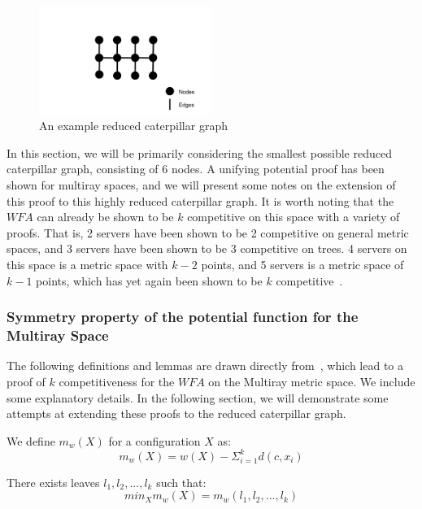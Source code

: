 \begin{figure}[H]
    \centering
    \includegraphics[width=0.5\textwidth]{images/reducedCaterpillar.png}
    \caption{An example reduced caterpillar graph}
\end{figure}

In this section, we will be primarily considering the smallest possible reduced caterpillar graph, consisting of 6 nodes. A unifying potential proof has been shown for multiray spaces, and we will present some notes on the extension of this proof to this highly reduced caterpillar graph. It is worth noting that the $WFA$ can already be shown to be $k$ competitive on this space with a variety of proofs. That is, 2 servers have been shown to be 2 competitive on general metric spaces, and 3 servers have been shown to be 3 competitive on trees. 4 servers on this space is a metric space with $k-2$ points, and 5 servers is a metric space of $k-1$ points, which has yet again been shown to be $k$ competitive~\cite{unifyingPotential2021}.

\subsubsection*{Symmetry property of the potential function for the Multiray Space}

The following definitions and lemmas are drawn directly from~\cite{unifyingPotential2021}, which lead to a proof of $k$ competitiveness for the $WFA$ on the Multiray metric space. We include some explanatory details. In the following section, we will demonstrate some attempts at extending these proofs to the reduced caterpillar graph.

\begin{definition}
    \label{def:mw}
    We define $m_w(X)$ for a configuration $X$ as:
    \begin{equation*}
        m_w(X) = w(X) - \Sigma_{i=1} ^ k d(c, x_i)
    \end{equation*}
\end{definition}

\begin{lemma}
    \label{lem:leaf2}
    There exists leaves $l_1, l_2, ..., l_k$ such that: 
    \begin{equation*}
        min_X m_w(X) = m_w (l_1, l_2, ..., l_k)
    \end{equation*}
\end{lemma}

